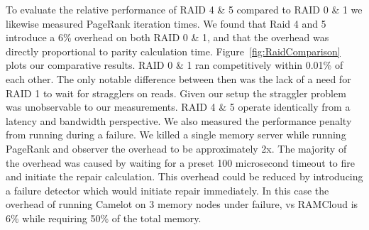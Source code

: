 To evaluate the relative performance of RAID 4 \& 5 compared to RAID
0 \& 1 we likewise measured PageRank iteration times. We found that
Raid 4 and 5 introduce a 6\% overhead on both RAID 0 \& 1, and that
the overhead was directly proportional to parity calculation time.
Figure~\ref{fig:RaidComparison} plots our comparative results. RAID 0
\& 1 ran competitively within 0.01\% of each other. The only notable
difference between then was the lack of a need for RAID 1 to wait for
stragglers on reads. Given our setup the straggler problem was
unobservable to our measurements. RAID 4 \& 5 operate identically from
a latency and bandwidth perspective. We also measured the performance
penalty from running during a failure. We killed a single memory
server while running PageRank and observer the overhead to be
approximately 2x. The majority of the overhead was caused by waiting for
a preset 100 microsecond timeout to fire and initiate the repair
calculation. This overhead could be reduced by introducing a failure
detector which would initiate repair immediately. In this case the
overhead of running Camelot on 3 memory nodes under failure, vs
RAMCloud is 6\% while requiring 50\% of the total memory.

